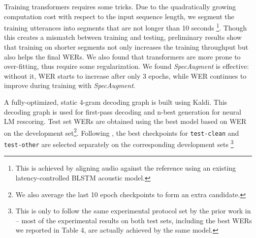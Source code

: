\documentclass{article}
\begin{document}
Training transformers requires some tricks. Due to the quadratically growing computation cost with respect to the input sequence length, we segment the training utterances into segments that are not longer than 10 seconds \footnote{
This is achieved by aligning audio against the reference using an existing latency-controlled BLSTM acoustic model. }. Though this creates a mismatch between training and testing, preliminary results show that training on shorter segments not only increases the training throughput but also helps the final WERs. We also found that transformers are more prone to over-fitting, thus require some regularization. We found \emph{SpecAugment}\cite{park2019specaugment} is effective: without it, WER starts to increase after only 3 epochs, while WER continues to improve during training with \emph{SpecAugment}.

A fully-optimized, static 4-gram decoding graph is built using Kaldi. This decoding graph is used for first-pass decoding and n-best generation for neural LM rescoring. Test set WERs are obtained using the best model based on WER on the development set\footnote{We also average the last 10 epoch checkpoints to form an extra candidate.}. 
Following \cite{luscher2019rwth}, the best checkpoints for \texttt{test-clean} and \texttt{test-other} are selected separately on the corresponding development sets \footnote{This is only to follow the same experimental protocol set by the prior work in \cite{luscher2019rwth} -- most of the experimental results on both test sets, including the best WERs we reported in Table 4, are actually achieved by the same model.} 
\end{document}
